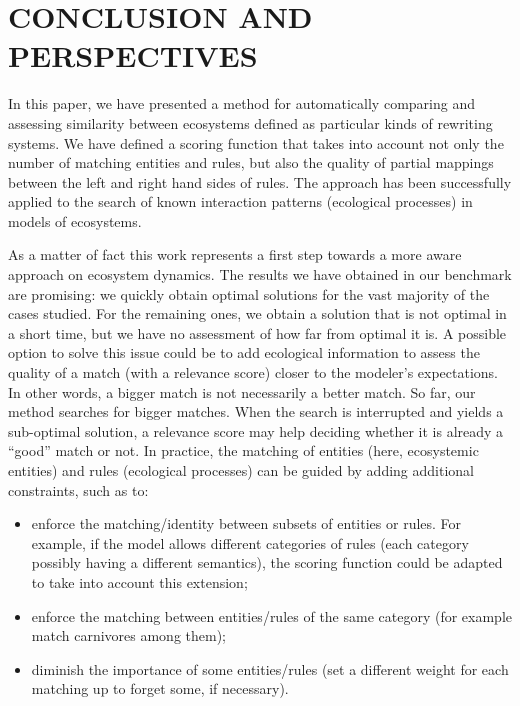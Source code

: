 \documentclass[a4paper,twoside]{article}
\begin{document}
\section{\uppercase{Conclusion and perspectives}}
\label{sec:conclusion}

In this paper, we have presented a method for automatically comparing and assessing similarity between ecosystems defined as particular kinds of rewriting systems. %
We have defined a scoring function that takes into account not only the number of matching entities and rules, but also the quality of partial mappings between the left and right hand sides of rules. 
The approach has been successfully applied to the search of known interaction patterns (\ie ecological processes) in models of ecosystems. %

As a matter of fact this work represents a first step towards a more aware approach on ecosystem dynamics. 
The results we have obtained in our benchmark are promising: we quickly obtain optimal solutions for the vast majority of the cases studied. 
For the remaining ones, we obtain a solution that is not optimal in a short time, but we have no assessment of how far from optimal it is.
A possible option to solve this issue could be to add ecological information to assess the quality of a match (with a relevance score) closer to the modeler's expectations. %
In other words, a bigger match is not necessarily a better match. So far, our method searches for bigger matches. When the search is interrupted and yields a sub-optimal solution, a relevance score may help deciding whether it is already a ``good'' match or not.  %
In practice, the matching of entities (here, ecosystemic entities) and rules (ecological processes) can be guided by adding additional constraints, such as to: %
\begin{itemize}
 \item enforce the matching/identity between subsets of entities or rules. For example, if the model allows different categories of rules (each category possibly having a different semantics), the scoring function could be adapted to take into account this extension; %
 \item enforce the matching between entities/rules of the same category (for example match carnivores among them);
 \item diminish the importance of some entities/rules (\ie set a different weight for each matching up to forget some, if necessary).
 \end{itemize}
\end{document}
